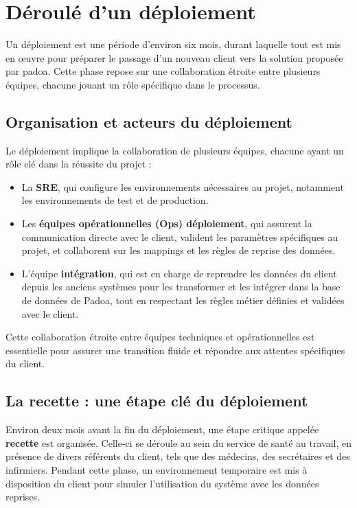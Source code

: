 \section{Déroulé d'un déploiement}

Un déploiement est une période d’environ six mois, durant laquelle tout est mis en œuvre pour préparer le passage d’un nouveau client vers la solution proposée par padoa. Cette phase repose sur une collaboration étroite entre plusieurs équipes, chacune jouant un rôle spécifique dans le processus.

\subsection{Organisation et acteurs du déploiement}

Le déploiement implique la collaboration de plusieurs équipes, chacune ayant un rôle clé dans la réussite du projet :
\begin{itemize}
    \item La \textbf{SRE}, qui configure les environnements nécessaires au projet, notamment les environnements de test et de production.
    \item Les \textbf{équipes opérationnelles (Ops) déploiement}, qui assurent la communication directe avec le client, valident les paramètres spécifiques au projet, et collaborent sur les mappings et les règles de reprise des données.
    \item L’équipe \textbf{intégration}, qui est en charge de reprendre les données du client depuis les anciens systèmes pour les transformer et les intégrer dans la base de données de Padoa, tout en respectant les règles métier définies et validées avec le client.
\end{itemize}

Cette collaboration étroite entre équipes techniques et opérationnelles est essentielle pour assurer une transition fluide et répondre aux attentes spécifiques du client.

\subsection{La recette : une étape clé du déploiement}

Environ deux mois avant la fin du déploiement, une étape critique appelée \textbf{recette} est organisée. Celle-ci se déroule au sein du service de santé au travail, en présence de divers référents du client, tels que des médecins, des secrétaires et des infirmiers. Pendant cette phase, un environnement temporaire est mis à disposition du client pour simuler l’utilisation du système avec les données reprises.

